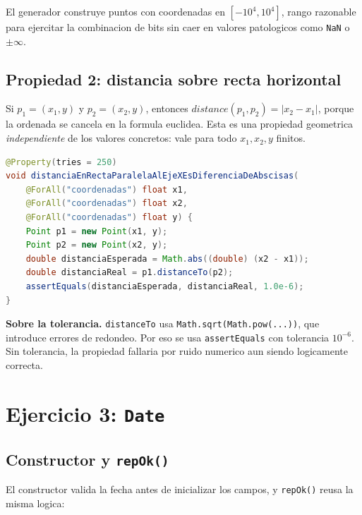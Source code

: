 \documentclass[12pt,a4paper]{article}
\begin{document}
El generador construye puntos con coordenadas en $[-10^4, 10^4]$, rango razonable para
ejercitar la combinacion de bits sin caer en valores patologicos como \texttt{NaN} o
$\pm\infty$.

\subsection{Propiedad 2: distancia sobre recta horizontal}

Si $p_1 = (x_1, y)$ y $p_2 = (x_2, y)$, entonces $\textit{distance}(p_1, p_2) = |x_2 - x_1|$,
porque la ordenada se cancela en la formula euclidea. Esta es una propiedad geometrica
\emph{independiente} de los valores concretos: vale para todo $x_1, x_2, y$ finitos.

\begin{lstlisting}[style=codestyle,language=Java]
@Property(tries = 250)
void distanciaEnRectaParalelaAlEjeXEsDiferenciaDeAbscisas(
    @ForAll("coordenadas") float x1,
    @ForAll("coordenadas") float x2,
    @ForAll("coordenadas") float y) {
    Point p1 = new Point(x1, y);
    Point p2 = new Point(x2, y);
    double distanciaEsperada = Math.abs((double) (x2 - x1));
    double distanciaReal = p1.distanceTo(p2);
    assertEquals(distanciaEsperada, distanciaReal, 1.0e-6);
}
\end{lstlisting}

\textbf{Sobre la tolerancia.} \texttt{distanceTo} usa \texttt{Math.sqrt(Math.pow(...))}, que
introduce errores de redondeo. Por eso se usa \texttt{assertEquals} con tolerancia $10^{-6}$.
Sin tolerancia, la propiedad fallaria por ruido numerico aun siendo logicamente correcta.

\section{Ejercicio 3: \texttt{Date}}

\subsection{Constructor y \texttt{repOk()}}

El constructor valida la fecha antes de inicializar los campos, y \texttt{repOk()} reusa la
misma logica:
\end{document}
